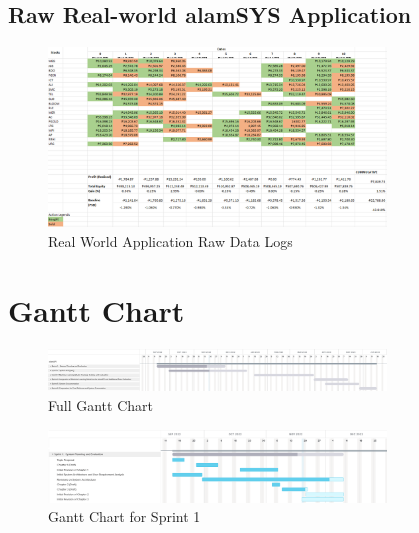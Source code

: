 \subsection{Raw Real-world alamSYS Application}
\label{subsec:rawalamSYSapp}

\begin{figure}[ht]
    \centering
    \includegraphics[width=0.80\textwidth]{./assets/Appendices/B/RawTestsData/RealWorldApplicationLog.png}
    \caption{Real World Application Raw Data Logs}
    \label{fig:RealWorldApplicationLog}
\end{figure}
\FloatBarrier


\section{Gantt Chart}

\begin{figure}[ht]
    \centering
    \includegraphics[width=0.80\textwidth]{./assets/Chapter_3/Gantt/Gantt_Chart_Full.png}
    \caption{Full Gantt Chart}
    \label{fig:gantt_chart_full}
\end{figure}
\FloatBarrier

\begin{figure}[ht]
    \centering
    \includegraphics[width=0.80\textwidth]{./assets/Chapter_3/Gantt/Gantt_Chart_Sprint1.png}
    \caption{Gantt Chart for Sprint 1}
    \label{fig:gantt_chart_sprint1}
\end{figure}
\FloatBarrier

